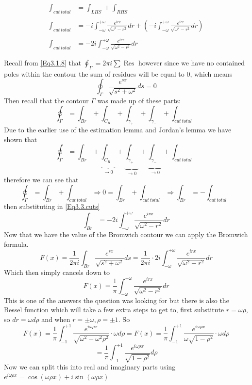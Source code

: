 \begin{align}
    \int_{cut \ total} &=\int_{LHS}+\int_{RHS} \nonumber\\
    \nonumber\\
    \int_{cut \ total} &=-i\int^{+\omega}_{-\omega}\frac{e^
{irx}}{\sqrt{\omega^2-r^2}}dr+\left(-i\int^{+\omega}_{-\omega}\frac{e^
{irx}}{\sqrt{\omega^2-r^2}}dr\right) \nonumber\\
\nonumber\\
\int_{cut \ total} &= -2i\int^{+\omega}_{-\omega}\frac{e^
{irx}}{\sqrt{\omega^2-r^2}}dr \label{Eq3.3.cuts}
\end{align}


Recall from \ref{Eq3.1.8} that $\oint_{\Gamma}=2\pi i\sum\operatorname{Res}$ however since we have no contained poles within the contour the sum of residues will be equal to 0, which means $$\oint_{\Gamma}\frac{e^{sx}}{\sqrt{s^2+\omega^2}}ds=0$$ Then recall that the contour $\Gamma$ was made up of these parts:
$$\oint_{\Gamma}=\int_{Br}+\int_{C_R}+\int_{\gamma_+}+\int_{\gamma_-}+\int_{cut \ total}$$ Due to the earlier use of the estimation lemma and Jordan's lemma we have shown that 
$$\oint_{\Gamma}=\int_{Br}+\underbrace{\int_{C_R}}_{\to0}+\underbrace{\int_{\gamma_+}}_{\to0}+\underbrace{\int_{\gamma_-}}_{\to0}+\int_{cut \ total}$$ therefore we can see that $$\oint_{\Gamma}=\int_{Br}+\int_{cut \ total}\Rightarrow0=\int_{Br}+\int_{cut \ total}\Rightarrow\int_{Br}=-\int_{cut \ total}$$ then substituting in \ref{Eq3.3.cuts} $$\int_{Br}=-2i\int^{+\omega}_{-\omega}\frac{e^
{irx}}{\sqrt{\omega^2-r^2}}dr$$ Now that we have the value of the Bromwich contour we can apply the Bromwich formula. $$F(x)=\frac{1}{2\pi i}\int_{Br}\frac{e^{sx}}{\sqrt{s^2+\omega^2}}ds=\frac{1}{2\pi i}\cdot 2i\int^{+\omega}_{-\omega}\frac{e^{irx}}{\sqrt{\omega^2-r^2}}dr$$ Which then simply cancels down to 
\begin{equation}\label{3.3.ans1}
    F(x)=\frac{1}{\pi}\int^{+\omega}_{-\omega}\frac{e^{irx}}{\sqrt{\omega^2-r^2}}dr
\end{equation}
This is one of the answers the question was looking for but there is also the Bessel function which will take a few extra steps to get to, first substitute $r=\omega\rho$, so $dr=\omega d\rho$ and when $r=\pm\omega, \rho=\pm1$. So $$F(x)=\frac{1}{\pi}\int^{+1}_{-1}\frac{e^{i\omega\rho x}}{\sqrt{\omega^2-\omega^2\rho^2}}\cdot \omega d\rho=F(x)=\frac{1}{\pi}\int^{+1}_{-1}\frac{e^{i\omega\rho x}}{\omega\sqrt{1-\rho^2}}\cdot\omega d\rho$$ $$=\frac{1}{\pi}\int^{+1}_{-1}\frac{e^{i\omega\rho x}}{\sqrt{1-\rho^2}}d\rho$$ Now we can split this into real and imaginary parts using $e^{i\omega\rho x}=\cos(\omega\rho x)+i\sin(\omega\rho x)$ 
